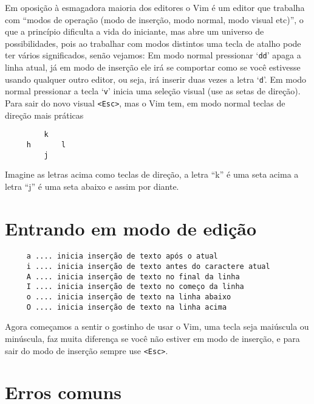 Em oposição à esmagadora maioria dos editores o Vim é um editor que trabalha
com ``modos de operação (modo de inserção, modo normal, modo visual etc)'', o
que a princípio dificulta a vida do iniciante, mas abre um universo de
possibilidades, pois ao trabalhar com modos distintos uma tecla de atalho pode
ter vários significados, senão vejamos: Em modo normal pressionar `{\tt dd}'
apaga a linha atual, já em modo de inserção ele irá se comportar como se você
estivesse usando qualquer outro editor, ou seja, irá inserir duas vezes a letra
`{\tt d}'.  Em modo normal pressionar a tecla `{\tt v}' inicia uma seleção visual (use
as setas de direção).  Para sair do novo visual \verb|<Esc>|, mas o Vim tem, em
modo normal teclas de direção mais práticas

\begin{verbatim}
         k
     h       l
         j
\end{verbatim}

Imagine as letras acima como teclas de direção, a letra ``k'' é uma seta acima
a letra ``j'' é uma seta abaixo e assim por diante.

\section{Entrando em modo de edição}
\label{Entrando em modo de edição}

\begin{verbatim}
     a .... inicia inserção de texto após o atual
     i .... inicia inserção de texto antes do caractere atual
     A .... inicia inserção de texto no final da linha
     I .... inicia inserção de texto no começo da linha
     o .... inicia inserção de texto na linha abaixo
     O .... inicia inserção de texto na linha acima
\end{verbatim}

Agora começamos a sentir o gostinho de usar o Vim, uma tecla seja
maiúscula ou minúscula, faz muita diferença se você não estiver em
modo de inserção, e para sair do modo de inserção sempre use \verb|<Esc>|.


\section{Erros comuns}\label{sec:Erros comuns}

